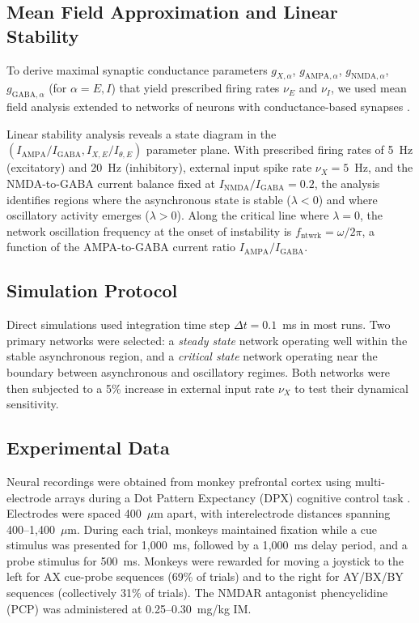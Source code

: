 \documentclass[10pt]{article}
\begin{document}
\subsection{Mean Field Approximation and Linear Stability}

To derive maximal synaptic conductance parameters $g_{X,\alpha}$,
$g_{\text{AMPA},\alpha}$, $g_{\text{NMDA},\alpha}$, $g_{\text{GABA},\alpha}$
(for $\alpha = E, I$) that yield prescribed firing rates $\nu_E$ and $\nu_I$,
we used mean field analysis \citep{amit1997model, brunel2000dynamics} extended
to networks of neurons with conductance-based synapses
\citep{brunel2001effects}.

Linear stability analysis reveals a state diagram in the
$(I_{\text{AMPA}}/I_{\text{GABA}}, I_{X,E}/I_{\theta,E})$ parameter plane.
With prescribed firing rates of 5~Hz (excitatory) and 20~Hz (inhibitory),
external input spike rate $\nu_X = 5$~Hz, and the NMDA-to-GABA current balance
fixed at $I_{\text{NMDA}}/I_{\text{GABA}} = 0.2$, the analysis identifies
regions where the asynchronous state is stable ($\lambda < 0$) and where
oscillatory activity emerges ($\lambda > 0$). Along the critical line where
$\lambda = 0$, the network oscillation frequency at the onset of instability
is $f_{\text{ntwrk}} = \omega / 2\pi$, a function of the AMPA-to-GABA current
ratio $I_{\text{AMPA}}/I_{\text{GABA}}$.

\subsection{Simulation Protocol}

Direct simulations used integration time step $\Delta t = 0.1$~ms in most
runs. Two primary networks were selected: a \emph{steady state} network
operating well within the stable asynchronous region, and a \emph{critical
state} network operating near the boundary between asynchronous and
oscillatory regimes. Both networks were then subjected to a 5\% increase in
external input rate $\nu_X$ to test their dynamical sensitivity.

\subsection{Experimental Data}

Neural recordings were obtained from monkey prefrontal cortex using
multi-electrode arrays during a Dot Pattern Expectancy (DPX) cognitive
control task \citep{zick2018blocking}. Electrodes were spaced 400~$\mu$m
apart, with interelectrode distances spanning 400--1{,}400~$\mu$m. During
each trial, monkeys maintained fixation while a cue stimulus was presented
for 1{,}000~ms, followed by a 1{,}000~ms delay period, and a probe stimulus
for 500~ms. Monkeys were rewarded for moving a joystick to the left for AX
cue-probe sequences (69\% of trials) and to the right for AY/BX/BY sequences
(collectively 31\% of trials). The NMDAR antagonist phencyclidine (PCP) was
administered at 0.25--0.30~mg/kg IM.
\end{document}
